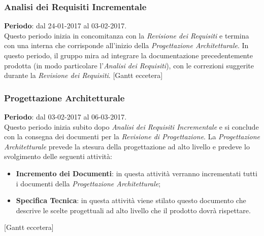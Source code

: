 	\subsubsection{Analisi dei Requisiti Incrementale}
	\textbf{Periodo}: dal 24-01-2017 al 03-02-2017.
	\\ Questo periodo inizia in concomitanza con la \emph{Revisione dei Requisiti} e termina con una  interna che corrisponde all'inizio della \emph{Progettazione Architetturale}. In questo periodo, il gruppo mira ad integrare la documentazione precedentemente prodotta (in modo particolare l'\emph{Analisi dei Requisiti}), con le correzioni suggerite durante la \emph{Revisione dei Requisiti}.
	[Gantt eccetera]
	\subsubsection{Progettazione Architetturale}
	\textbf{Periodo}: dal 03-02-2017 al 06-03-2017.	
	\\ Questo periodo inizia subito dopo \emph{Analisi dei Requisiti Incrementale} e si conclude con la consegna dei documenti per la \emph{Revisione di Progettazione}. La \emph{Progettazione Architetturale} prevede la stesura della progettazione ad alto  livello e predeve lo svolgimento delle seguenti attività:
	\begin{itemize}
		\item \textbf{Incremento dei Documenti}: in questa attività verranno incrementati tutti i documenti della \emph{Progettazione Architetturale};
		\item \textbf{Specifica Tecnica}: in questa attività viene stilato questo documento che descrive le scelte progettuali ad alto livello che il prodotto dovrà rispettare.
	\end{itemize}
	[Gantt eccetera]
